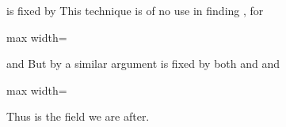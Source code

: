\documentclass[11pt,oneside]{article}
\begin{document}
\BookNarrativetrue

\begin{BookBody}

\noindent is fixed by  This technique is of no use in finding , for

\begin{center}\begin{adjustbox}{max width=\linewidth}\end{adjustbox}\end{center}

\noindent and  But by a similar argument is fixed by both  and  and

\begin{center}\begin{adjustbox}{max width=\linewidth}\end{adjustbox}\end{center}

\noindent Thus  is the field we are after. \BookEnd{\blacktriangle}

\end{BookBody}

\BookNarrativefalse
\end{document}
